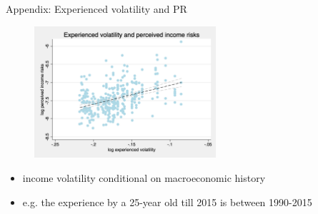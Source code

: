 \documentclass{beamer}
\begin{document}



\begin{frame}{Appendix: Experienced volatility and PR}
	\label{appendix:experience}
	\begin{figure}
		\centering 
		\label{experience_var_var_var}
		\includegraphics[width=0.6\textwidth]{figures/experience_var_var_data.png}
	\end{figure}
	\begin{itemize}
		\item income volatility conditional on macroeconomic history \cite{storesletten2004cyclical}
		\item e.g. the experience by a 25-year old till 2015 is between 1990-2015
	\end{itemize}
\end{frame}
\end{document}
